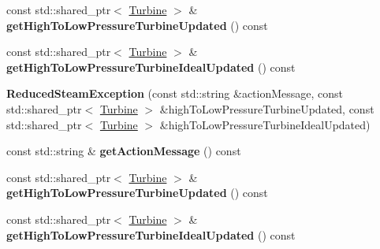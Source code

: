 \begin{DoxyCompactItemize}
const std\+::shared\+\_\+ptr$<$ \hyperlink{class_turbine}{Turbine} $>$ \& {\bfseries get\+High\+To\+Low\+Pressure\+Turbine\+Updated} () const
\item 
\mbox{\label{class_reduced_steam_exception_aed98ac6e7234d6bdc64f49ff0080d1d2}} 
const std\+::shared\+\_\+ptr$<$ \hyperlink{class_turbine}{Turbine} $>$ \& {\bfseries get\+High\+To\+Low\+Pressure\+Turbine\+Ideal\+Updated} () const
\item 
\mbox{\label{class_reduced_steam_exception_afc96e8f3ba0863ad109d45fa2ae75308}} 
{\bfseries Reduced\+Steam\+Exception} (const std\+::string \&action\+Message, const std\+::shared\+\_\+ptr$<$ \hyperlink{class_turbine}{Turbine} $>$ \&high\+To\+Low\+Pressure\+Turbine\+Updated, const std\+::shared\+\_\+ptr$<$ \hyperlink{class_turbine}{Turbine} $>$ \&high\+To\+Low\+Pressure\+Turbine\+Ideal\+Updated)
\item 
\mbox{\label{class_reduced_steam_exception_a80743e934f15a87998206463f7a3dec7}} 
const std\+::string \& {\bfseries get\+Action\+Message} () const
\item 
\mbox{\label{class_reduced_steam_exception_a50f300c4df4c5f2493cf29c2b59ff781}} 
const std\+::shared\+\_\+ptr$<$ \hyperlink{class_turbine}{Turbine} $>$ \& {\bfseries get\+High\+To\+Low\+Pressure\+Turbine\+Updated} () const
\item 
\mbox{\label{class_reduced_steam_exception_aed98ac6e7234d6bdc64f49ff0080d1d2}} 
const std\+::shared\+\_\+ptr$<$ \hyperlink{class_turbine}{Turbine} $>$ \& {\bfseries get\+High\+To\+Low\+Pressure\+Turbine\+Ideal\+Updated} () const
\end{DoxyCompactItemize}
